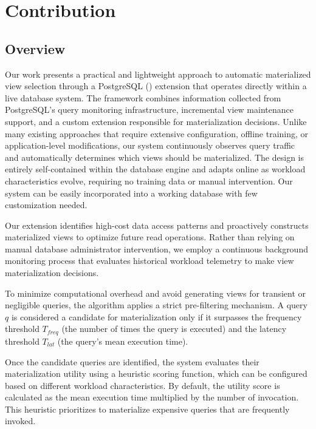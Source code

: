 \section{Contribution}

\subsection{Overview}

Our work presents a practical and lightweight approach to automatic materialized view selection through a PostgreSQL (\textcite{postgresql_2026}) extension that operates directly within a live database system. The framework combines information collected from PostgreSQL's query monitoring infrastructure, incremental view maintenance support, and a custom extension responsible for materialization decisions. Unlike many existing approaches that require extensive configuration, offline training, or application-level modifications, our system continuously observes query traffic and automatically determines which views should be materialized. The design is entirely self-contained within the database engine and adapts online as workload characteristics evolve, requiring no training data or manual intervention. Our system can be easily incorporated into a working database with few customization needed.

Our extension identifies high-cost data access patterns and proactively constructs materialized views to optimize future read operations. Rather than relying on manual database administrator intervention, we employ a continuous background monitoring process that evaluates historical workload telemetry to make view materialization decisions.

To minimize computational overhead and avoid generating views for transient or negligible queries, the algorithm applies a strict pre-filtering mechanism. A query $q$ is considered a candidate for materialization only if it surpasses the frequency threshold $T_{freq}$ (the number of times the query is executed) and the latency threshold $T_{lat}$ (the query's mean execution time).

Once the candidate queries are identified, the system evaluates their materialization utility using a heuristic scoring function, which can be configured based on different workload characteristics. By default, the utility score is calculated as the mean execution time multiplied by the number of invocation. This heuristic prioritizes to materialize expensive queries that are frequently invoked.


